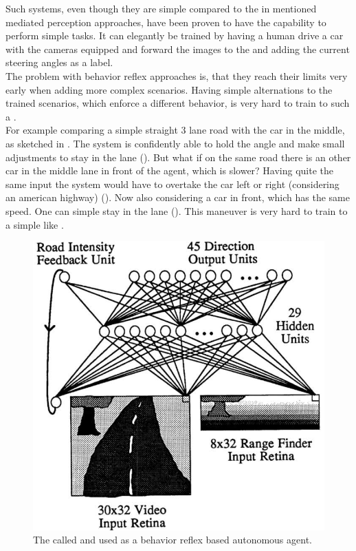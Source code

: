 Such systems, even though they are simple compared to the in  mentioned mediated perception approaches, have been proven to have the capability to perform simple tasks. It can elegantly be trained by having a human drive a car with the cameras equipped and forward the images to the \nn and adding the current steering angles as a label.\cite{chen2015deepdriving}\\

The problem with behavior reflex approaches is, that they reach their limits very early when adding more complex scenarios. Having simple alternations to the trained scenarios, which enforce a different behavior, is very hard to train to such a \nn.\\
For example comparing a simple straight 3 lane road with the car in the middle, as sketched in . The system is confidently able to hold the angle and make small adjustments to stay in the lane (). But what if on the same road there is an other car in the middle lane in front of the agent, which is slower? Having quite the same input the system would have to overtake the car left or right (considering an american highway) (). Now also considering a car in front, which has the same speed. One can simple stay in the lane (). This maneuver is very hard to train to a simple \nn like \alvinn.




\begin{figure}
	\centering
	\includegraphics[scale=0.4]{src/pic/ALVINN.png}
	\caption{The \nn called \alvinn and used as a behavior reflex based autonomous agent. \cite{pomerleau1989alvinn}}
	\label{pic: ALVINN}
\end{figure}

